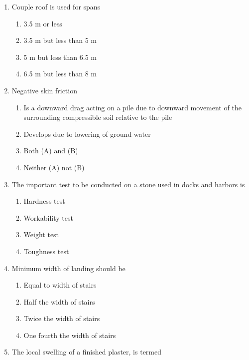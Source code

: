\documentclass[11pt,a4paper]{article}
\begin{document}
\begin{enumerate}
\begin{enumerate*}[itemjoin=\qquad, label=\Alph*.]
\item{20 mm}
\end{enumerate*}
\item{Couple roof is used for spans}
\begin{enumerate}[label=\Alph*.]
\item{3.5 m or less}
\item{3.5 m but less than 5 m}
\item{5 m but less than 6.5 m}
\item{6.5 m but less than 8 m}
\end{enumerate}
\item{Negative skin friction}
\begin{enumerate}[label=\Alph*.]
\item{Is a downward drag acting on a pile due to downward movement of the surrounding compressible soil relative to the pile}
\item{Develops due to lowering of ground water}
\item{Both (A) and (B)}
\item{Neither (A) not (B)}
\end{enumerate}
\item{The important test to be conducted on a stone used in docks and harbors is}
\begin{enumerate}[label=\Alph*.]
\item{Hardness test}
\item{Workability test}
\item{Weight test}
\item{Toughness test}
\end{enumerate}
\item{Minimum width of landing should be}
\begin{enumerate}[label=\Alph*.]
\item{Equal to width of stairs}
\item{Half the width of stairs}
\item{Twice the width of stairs}
\item{One fourth the width of stairs}
\end{enumerate}
\item{The local swelling of a finished plaster, is termed}
\\
\end{enumerate}
\end{document}
